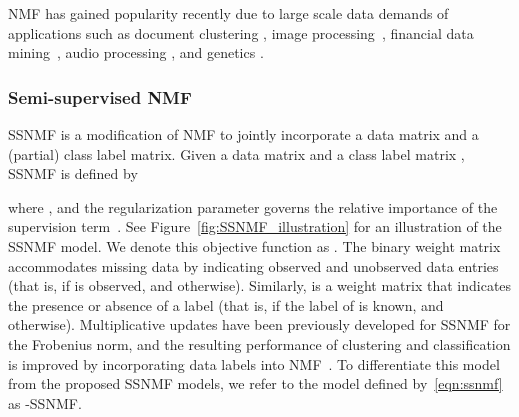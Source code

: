 \documentclass[twocolumn,10pt]{article}
\begin{document}
NMF has gained popularity recently due to large scale data demands of
applications 
such as document clustering \cite{gaussier2005relation,shahnaz2006document,xu2003document,berry2005email,pauca2004text}, 
image processing~\cite{guillamet2002non,hoyer2002non,lee1999learning}, 
financial data mining~\cite{de2008analysis},  
audio processing \cite{cichocki2006new,gemmeke2013exemplar}, 
and genetics \cite{liu2017regularized}. 

\subsubsection*{Semi-supervised NMF}
SSNMF is a modification of NMF to jointly incorporate a data matrix and a (partial) class label matrix. 
Given a data matrix  and a class label matrix , SSNMF is defined by 

where , and the regularization parameter  governs the relative importance of the supervision term~\cite{lee2009semi}. See Figure~\ref{fig:SSNMF_illustration} for an illustration of the SSNMF model.
We denote this objective function as . 
The binary weight matrix  accommodates  missing data by indicating observed and unobserved data entries (that is,  if  is observed, and  otherwise).
 Similarly,  is a weight matrix that indicates the presence or absence of a label (that is,  if the label of  is known, and  otherwise).  
Multiplicative updates have been previously developed for SSNMF for the Frobenius norm, and the resulting performance of clustering and classification is improved by incorporating data labels into NMF~\cite{lee2009semi}.
To differentiate this model from the proposed SSNMF models, we refer to the model defined by~\eqref{eqn:ssnmf} as -SSNMF.
\end{document}
